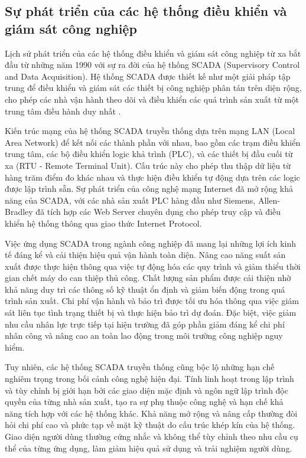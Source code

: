 \documentclass[../main.tex]{subfiles}
\begin{document}
\subsection{Sự phát triển của các hệ thống điều khiển và giám sát công nghiệp}
\label{sec:industrial_control_monitoring_evolution}

Lịch sử phát triển của các hệ thống điều khiển và giám sát công nghiệp từ xa bắt đầu từ những năm 1990 với sự ra đời của hệ thống SCADA (Supervisory Control and Data Acquisition). Hệ thống SCADA được thiết kế như một giải pháp tập trung để điều khiển và giám sát các thiết bị công nghiệp phân tán trên diện rộng, cho phép các nhà vận hành theo dõi và điều khiển các quá trình sản xuất từ một trung tâm điều hành duy nhất \cite{boyer2009scada}.

Kiến trúc mạng của hệ thống SCADA truyền thống dựa trên mạng LAN (Local Area Network) để kết nối các thành phần với nhau, bao gồm các trạm điều khiển trung tâm, các bộ điều khiển logic khả trình (PLC), và các thiết bị đầu cuối từ xa (RTU - Remote Terminal Unit). Cấu trúc này cho phép thu thập dữ liệu từ hàng trăm điểm đo khác nhau và thực hiện điều khiển tự động dựa trên các logic được lập trình sẵn. Sự phát triển của công nghệ mạng Internet đã mở rộng khả năng của SCADA, với các nhà sản xuất PLC hàng đầu như Siemens, Allen-Bradley đã tích hợp các Web Server chuyên dụng cho phép truy cập và điều khiển hệ thống thông qua giao thức Internet Protocol.

Việc ứng dụng SCADA trong ngành công nghiệp đã mang lại những lợi ích kinh tế đáng kể và cải thiện hiệu quả vận hành toàn diện. Nâng cao năng suất sản xuất được thực hiện thông qua việc tự động hóa các quy trình và giảm thiểu thời gian chết máy do can thiệp thủ công. Chất lượng sản phẩm được cải thiện nhờ khả năng duy trì các thông số kỹ thuật ổn định và giảm biến động trong quá trình sản xuất. Chi phí vận hành và bảo trì được tối ưu hóa thông qua việc giám sát liên tục tình trạng thiết bị và thực hiện bảo trì dự đoán. Đặc biệt, việc giảm nhu cầu nhân lực trực tiếp tại hiện trường đã góp phần giảm đáng kể chi phí nhân công và nâng cao an toàn lao động trong môi trường công nghiệp nguy hiểm.

Tuy nhiên, các hệ thống SCADA truyền thống cũng bộc lộ những hạn chế nghiêm trọng trong bối cảnh công nghệ hiện đại. Tính linh hoạt trong lập trình và tùy chỉnh bị giới hạn bởi các giao diện mặc định và ngôn ngữ lập trình độc quyền của từng nhà sản xuất, tạo ra sự phụ thuộc công nghệ và hạn chế khả năng tích hợp với các hệ thống khác. Khả năng mở rộng và nâng cấp thường đòi hỏi chi phí cao và phức tạp về mặt kỹ thuật do cấu trúc khép kín của hệ thống. Giao diện người dùng thường cứng nhắc và không thể tùy chỉnh theo nhu cầu cụ thể của từng ứng dụng, làm giảm hiệu quả sử dụng và trải nghiệm người dùng.
\end{document}
